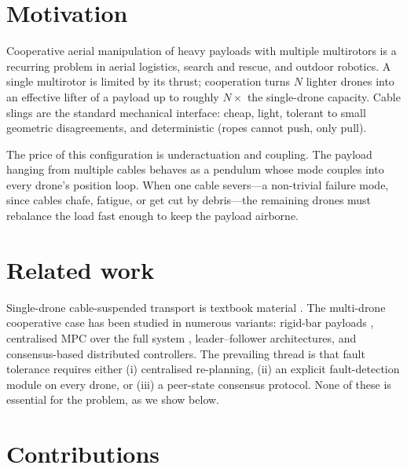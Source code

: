 \documentclass[11pt,a4paper,oneside]{report}
\begin{document}
\section{Motivation}

Cooperative aerial manipulation of heavy payloads with multiple
multirotors is a recurring problem in aerial logistics, search and
rescue, and outdoor robotics. A single multirotor is limited by its
thrust; cooperation turns $N$ lighter drones into an effective
lifter of a payload up to roughly $N\times$ the single-drone capacity.
Cable slings are the standard mechanical interface: cheap, light,
tolerant to small geometric disagreements, and deterministic
(ropes cannot push, only pull).

The price of this configuration is underactuation and coupling. The
payload hanging from multiple cables behaves as a pendulum whose
mode couples into every drone's position loop. When one cable
severs---a non-trivial failure mode, since cables chafe, fatigue, or
get cut by debris---the remaining drones must rebalance the load
fast enough to keep the payload airborne.

\section{Related work}

Single-drone cable-suspended transport is textbook material
\cite{Sreenath2013, Lee2010, Palunko2012}. The multi-drone cooperative
case has been studied in numerous variants: rigid-bar payloads
\cite{Lee2018}, centralised MPC over the full system
\cite{Wehbeh2021}, leader--follower architectures, and consensus-based
distributed controllers. The prevailing thread is that fault tolerance
requires either (i) centralised re-planning, (ii) an explicit
fault-detection module on every drone, or (iii) a peer-state
consensus protocol. None of these is essential for the problem,
as we show below.

\section{Contributions}
\label{sec:contributions}
\end{document}
